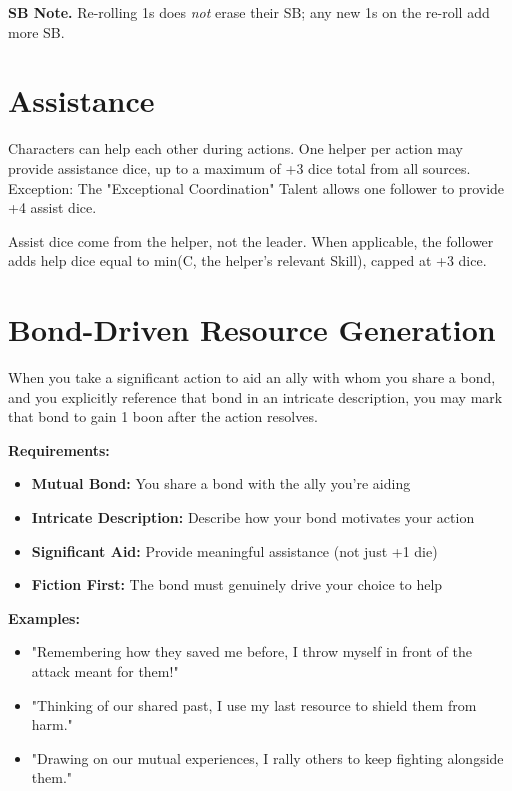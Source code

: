 \noindent\textbf{SB Note.} Re-rolling 1s does \emph{not} erase their SB; any new 1s on the re-roll add more SB.

\section{Assistance}

Characters can help each other during actions. One helper per action may provide assistance dice, up to a maximum of +3 dice total from all sources. Exception: The "Exceptional Coordination" Talent  allows one follower to provide +4 assist dice.

Assist dice come from the helper, not the leader. When applicable, the follower adds help dice equal to min(C, the helper's relevant Skill), capped at +3 dice.

\section{Bond-Driven Resource Generation}

When you take a significant action to aid an ally with whom you share a bond, and you explicitly reference that bond in an intricate description, you may mark that bond to gain 1 boon after the action resolves.

\textbf{Requirements:}
\begin{itemize}
    \item \textbf{Mutual Bond:} You share a bond with the ally you're aiding
    \item \textbf{Intricate Description:} Describe how your bond motivates your action
    \item \textbf{Significant Aid:} Provide meaningful assistance (not just +1 die)
    \item \textbf{Fiction First:} The bond must genuinely drive your choice to help
\end{itemize}

\textbf{Examples:}
\begin{itemize}
    \item "Remembering how they saved me before, I throw myself in front of the attack meant for them!"
    \item "Thinking of our shared past, I use my last resource to shield them from harm."
    \item "Drawing on our mutual experiences, I rally others to keep fighting alongside them."
\end{itemize}

